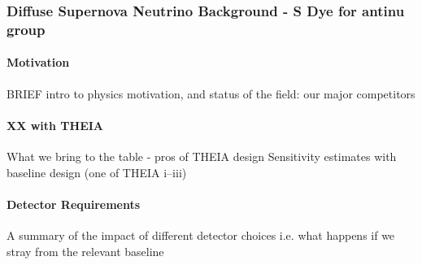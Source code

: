 \subsubsection{Diffuse Supernova Neutrino Background - S Dye for antinu group}
\paragraph{Motivation}
BRIEF intro to physics motivation, and status of the field: our major competitors
\paragraph{XX with THEIA}
What we bring to the table - pros of THEIA design \newline
Sensitivity estimates with baseline design (one of THEIA i--iii)
\paragraph{Detector Requirements}
A summary of the impact of different detector choices i.e. what happens if we stray from the relevant baseline
